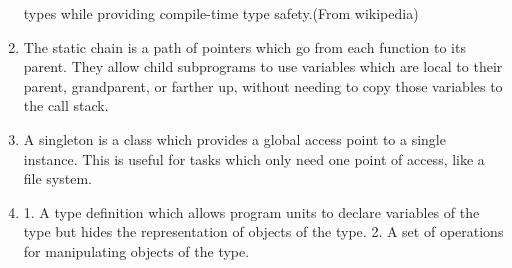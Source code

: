 \begin{answer}
\begin{enumerate}
  types while providing compile-time type safety.(From wikipedia)
\item The static chain is a path of pointers which go from each
  function to its parent. They allow child subprograms to use
  variables which are local to their parent, grandparent, or farther
  up, without needing to copy those variables to the call stack.
\item A singleton is a class which provides a global access point to a
  single instance. This is useful for tasks which only need one point
  of access, like a file system.
\item 1. A type definition which allows program units to declare
  variables of the type but hides the representation of objects of the
  type. 2. A set of operations for manipulating objects of the type.

\end{enumerate}
\end{answer}


